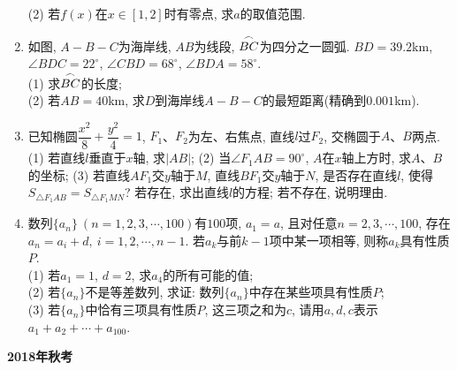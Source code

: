 \documentclass[10pt,a4paper]{article}
\begin{document}
\begin{enumerate}[1.]
(2) 若$f(x)$在$x\in [1,2]$时有零点, 求$a$的取值范围.
\item 如图, $A-B-C$为海岸线, $AB$为线段, $\overset{\LARGE{\frown}}{BC}$为四分之一圆弧. $BD=39.2$km, $\angle BDC=22^\circ$, $\angle CBD=68^\circ$, $\angle BDA=58^\circ$.\\
(1) 求$\overset{\LARGE{\frown}}{BC}$的长度;\\
(2) 若$AB=40$km, 求$D$到海岸线$A-B-C$的最短距离(精确到$0.001$km).
\begin{center}
\end{center}
\item 已知椭圆$\dfrac{x^2}{8}+\dfrac{y^2}{4}=1$, $F_1$、$F_2$为左、右焦点, 直线$l$过$F_2$, 交椭圆于$A$、$B$两点.\\
(1) 若直线$l$垂直于$x$轴, 求$|AB|$;
(2) 当$\angle F_1AB=90^\circ$, $A$在$x$轴上方时, 求$A$、$B$的坐标;
(3) 若直线$AF_1$交$y$轴于$M$, 直线$BF_1$交$y$轴于$N$, 是否存在直线$l$, 使得$S_{\triangle F_1AB}=S_{\triangle F_1MN}$? 若存在, 求出直线$l$的方程; 若不存在, 说明理由.
\item 数列$\{a_n\} \ (n=1,2,3,\cdots,100)$有$100$项, $a_1=a$, 且对任意$n=2,3,\cdots,100$, 存在$a_n=a_i+d, \ i=1,2,\cdots,n-1$. 若$a_k$与前$k-1$项中某一项相等, 则称$a_k$具有性质$P$.\\
(1) 若$a_1=1$, $d=2$, 求$a_4$的所有可能的值;\\
(2) 若$\{a_n\}$不是等差数列, 求证: 数列$\{a_n\}$中存在某些项具有性质$P$;\\
(3) 若$\{a_n\}$中恰有三项具有性质$P$, 这三项之和为$c$, 请用$a,d,c$表示$a_1+a_2+\cdots+a_{100}$.
\end{enumerate}

\newpage

{\bf 2018年秋考}
\end{document}
